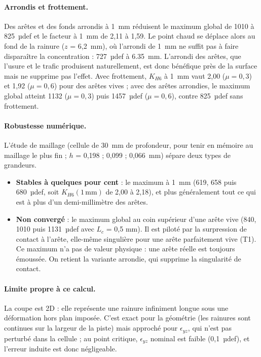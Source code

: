 \paragraph{Arrondis et frottement.} Des arêtes et des fonds arrondis à \SI{1}{mm} réduisent le
maximum global de 1010 à 825~µdef et le facteur à \SI{1}{mm} de
2,11 à 1,59. Le point chaud se déplace alors au fond de la
rainure ($z$ = 6,2~mm), où l'arrondi de \SI{1}{mm} ne suffit pas à faire disparaître la
concentration : 727~µdef à \SI{6.35}{mm}. L'arrondi des arêtes, que l'usure et le
trafic produisent naturellement, est donc bénéfique près de la surface mais ne supprime pas
l'effet. Avec frottement, $K_{H6}$ à \SI{1}{mm}
vaut 2,00 ($\mu=0{,}3$) et 1,92 ($\mu=0{,}6$) pour des arêtes vives ;
avec des arêtes arrondies, le maximum global atteint 1132 ($\mu=0{,}3$) puis
1457~µdef ($\mu=0{,}6$), contre 825~µdef sans frottement.

\paragraph{Robustesse numérique.} L'étude de maillage (cellule de \SI{30}{mm} de profondeur,
pour tenir en mémoire au maillage le plus fin ; $h$ = 0,198 ; 0,099 ; 0,066~mm)
sépare deux types de grandeurs.
\begin{itemize}[nosep]
\item \textbf{Stables à quelques pour cent} : le maximum à \SI{1}{mm} (619,
      658 puis 680~µdef, soit
      $K_{H6}(1\,\text{mm})$ de 2,00 à
      2,18), et plus généralement tout ce qui
      est à plus d'un demi-millimètre des arêtes.
\item \textbf{Non convergé} : le maximum global au coin supérieur d'une arête vive
      (840, 1010 puis
      1131~µdef avec $L_c$ = 0,5 mm). Il est piloté par la surpression de
      contact à l'arête, elle-même singulière pour une arête parfaitement vive (T1). Ce maximum
      n'a pas de valeur physique : une arête réelle est toujours émoussée. On retient la variante
      arrondie, qui supprime la singularité de contact.
\end{itemize}

\paragraph{Limite propre à ce calcul.} La coupe est 2D : elle représente une rainure infiniment
longue sous une déformation hors plan imposée. C'est exact pour la géométrie (les rainures sont
continues sur la largeur de la piste) mais approché pour $\epsilon_{yz}$, qui n'est pas perturbé
dans la cellule ; au point critique, $\epsilon_{yz}$ nominal est faible
(0,1~µdef), et l'erreur induite est donc négligeable.

